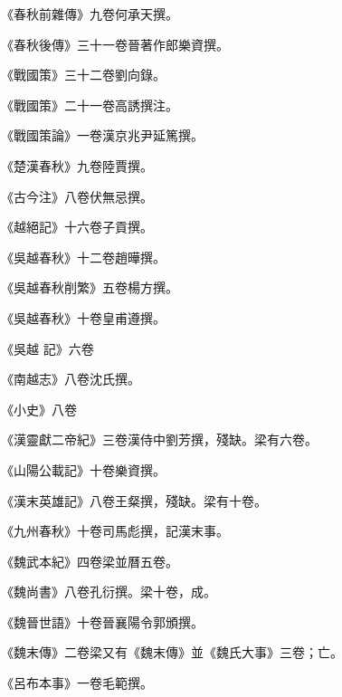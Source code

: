 \begin{pinyinscope}
 《春秋前雜傳》九卷何承天撰。



 《春秋後傳》三十一卷晉著作郎樂資撰。



 《戰國策》三十二卷劉向錄。



 《戰國策》二十一卷高誘撰注。



 《戰國策論》一卷漢京兆尹延篤撰。



 《楚漢春秋》九卷陸賈撰。



 《古今注》八卷伏無忌撰。



 《越絕記》十六卷子貢撰。



 《吳越春秋》十二卷趙曄撰。



 《吳越春秋削繁》五卷楊方撰。



 《吳越春秋》十卷皇甫遵撰。



 《吳越
 記》六卷



 《南越志》八卷沈氏撰。



 《小史》八卷



 《漢靈獻二帝紀》三卷漢侍中劉芳撰，殘缺。梁有六卷。



 《山陽公載記》十卷樂資撰。



 《漢末英雄記》八卷王粲撰，殘缺。梁有十卷。



 《九州春秋》十卷司馬彪撰，記漢末事。



 《魏武本紀》四卷梁並曆五卷。



 《魏尚書》八卷孔衍撰。梁十卷，成。



 《魏晉世語》十卷晉襄陽令郭頒撰。



 《魏末傳》二卷梁又有《魏末傳》並《魏氏大事》三卷；亡。



 《呂布本事》一卷毛範撰。




\end{pinyinscope}
